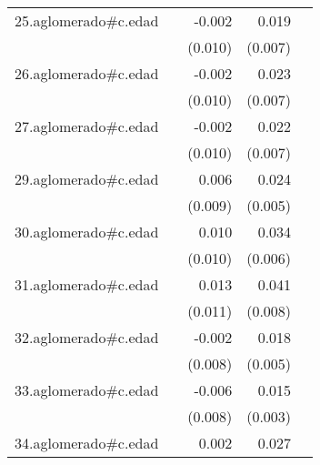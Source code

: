 {\begin{longtable}{l*{4}{D{.}{.}{-1}}}
\addlinespace
25.aglomerado#c.edad&                     &      -0.002         &       0.019\sym{**} &                     \\
            &                     &     (0.010)         &     (0.007)         &                     \\
\addlinespace
26.aglomerado#c.edad&                     &      -0.002         &       0.023\sym{***}&                     \\
            &                     &     (0.010)         &     (0.007)         &                     \\
\addlinespace
27.aglomerado#c.edad&                     &      -0.002         &       0.022\sym{**} &                     \\
            &                     &     (0.010)         &     (0.007)         &                     \\
\addlinespace
29.aglomerado#c.edad&                     &       0.006         &       0.024\sym{***}&                     \\
            &                     &     (0.009)         &     (0.005)         &                     \\
\addlinespace
30.aglomerado#c.edad&                     &       0.010         &       0.034\sym{***}&                     \\
            &                     &     (0.010)         &     (0.006)         &                     \\
\addlinespace
31.aglomerado#c.edad&                     &       0.013         &       0.041\sym{***}&                     \\
            &                     &     (0.011)         &     (0.008)         &                     \\
\addlinespace
32.aglomerado#c.edad&                     &      -0.002         &       0.018\sym{***}&                     \\
            &                     &     (0.008)         &     (0.005)         &                     \\
\addlinespace
33.aglomerado#c.edad&                     &      -0.006         &       0.015\sym{***}&                     \\
            &                     &     (0.008)         &     (0.003)         &                     \\
\addlinespace
34.aglomerado#c.edad&                     &       0.002         &       0.027\sym{***}&                     \\

\end{longtable}}
